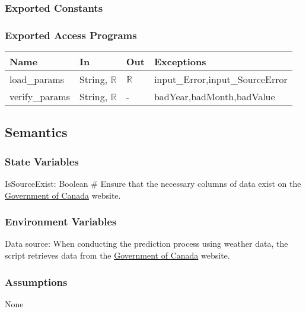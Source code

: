 \documentclass[12pt, titlepage]{article}
\begin{document}
\subsubsection{Exported Constants}

\subsubsection{Exported Access Programs}

\begin{center}
\begin{tabular}{p{2cm} p{2cm} p{2cm} p{5cm}}
\hline
\textbf{Name} & \textbf{In} & \textbf{Out} & \textbf{Exceptions} \\
\hline
load\_params & String, $\mathbb{R}$ & $\mathbb{R}$ & input\_Error,input\_SourceError\\
verify\_params & String, $\mathbb{R}$ & - & badYear,badMonth,badValue\\
\hline
\end{tabular}
\end{center}

\subsection{Semantics}

\subsubsection{State Variables}

IsSourceExist: Boolean \# Ensure that the necessary columns of data exist on the \href{https://climate.weather.gc.ca/historical_data/search_historic_data_e.html} {Government of Canada} website.

\subsubsection{Environment Variables}

Data source: When conducting the prediction process using weather data, the script retrieves data from the \href{https://climate.weather.gc.ca/historical_data/search_historic_data_e.html} {Government of Canada} website.

\subsubsection{Assumptions}

None
\end{document}
